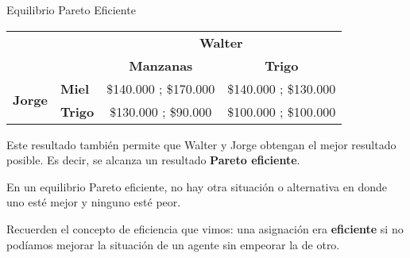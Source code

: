 \documentclass{beamer}
\begin{document}
\begin{frame}{Equilibrio Pareto Eficiente}
    \centering
    \setlength{\tabcolsep}{12pt}
    \renewcommand{\arraystretch}{1.4}
    
    \begin{tabular}{@{} l l | c c @{}}
    \multicolumn{2}{c}{} & \multicolumn{2}{c}{\textbf{Walter}} \\ \cmidrule{3-4}
    \multicolumn{2}{c}{} & \textbf{Manzanas} & \textbf{Trigo} \\
    \midrule
    \multirow{2}{*}{\textbf{Jorge}} 
      & \textbf{Miel}  & \textcolor{green!60!black}{\$140.000} ; \textcolor{blue!80!black}{\$170.000} & \textcolor{green!60!black}{\$140.000} ; \$130.000 \\
      & \textbf{Trigo} & \$130.000 ; \$90.000 & \$100.000 ; \textcolor{blue!80!black}{\$100.000} \\ \bottomrule
    \end{tabular}
    
    
    \justifying
    \vspace{6mm}
    Este resultado también permite que Walter y Jorge obtengan el mejor resultado posible. Es decir, se alcanza un resultado \textbf{Pareto eficiente}.
    \begin{boxA}
        \centering
        En un equilibrio Pareto eficiente, no hay otra situación o alternativa en donde uno esté mejor y ninguno esté peor. 
    \end{boxA}
    \small
    Recuerden el concepto de eficiencia que vimos: una asignación era \textbf{eficiente} si no podíamos mejorar la situación de un agente sin empeorar la de otro.
\end{frame}
\end{document}
